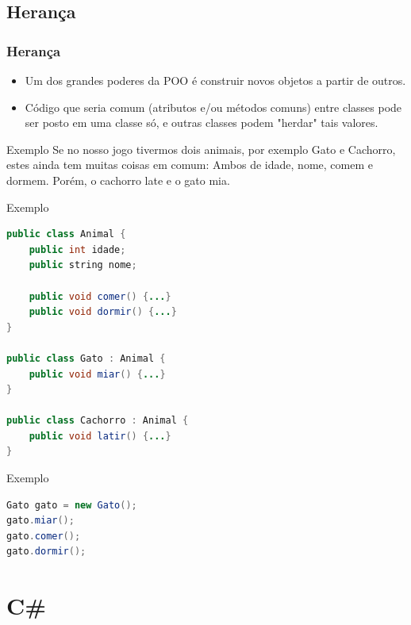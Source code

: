 \documentclass{beamer}
\begin{document}
	\subsection{Herança} %
	\begin{frame}
		\frametitle{Herança}

		\begin{itemize}
			\item Um dos grandes poderes da POO é construir novos objetos a
				partir de outros.

			\item Código que seria comum (atributos e/ou métodos comuns) entre
				classes pode ser posto em uma classe só, e outras classes podem
				"herdar" tais valores.
		\end{itemize}

		\begin{block}{Exemplo}
			Se no nosso jogo tivermos dois animais, por exemplo Gato e
			Cachorro, estes ainda tem muitas coisas em comum: Ambos de idade,
			nome, comem e dormem. Porém, o cachorro late e o gato mia.
		\end{block}
	\end{frame}

	\begin{frame}[fragile]
		\begin{block}{Exemplo}
			\begin{lstlisting}[language=Java,basicstyle=\ttfamily,keywordstyle=\color{blue}]
public class Animal {
	public int idade;
	public string nome;

	public void comer() {...}
	public void dormir() {...}
}

public class Gato : Animal {
	public void miar() {...}
}

public class Cachorro : Animal {
	public void latir() {...}
}
			\end{lstlisting}
		\end{block}
	\end{frame}

	\begin{frame}[fragile]
		\begin{block}{Exemplo}
			\begin{lstlisting}[language=Java,basicstyle=\ttfamily,keywordstyle=\color{blue}]
Gato gato = new Gato();
gato.miar();
gato.comer();
gato.dormir();
			\end{lstlisting}
		\end{block}
	\end{frame}

	\section{C\#}
	\frame{\sectionpage}
\end{document}

